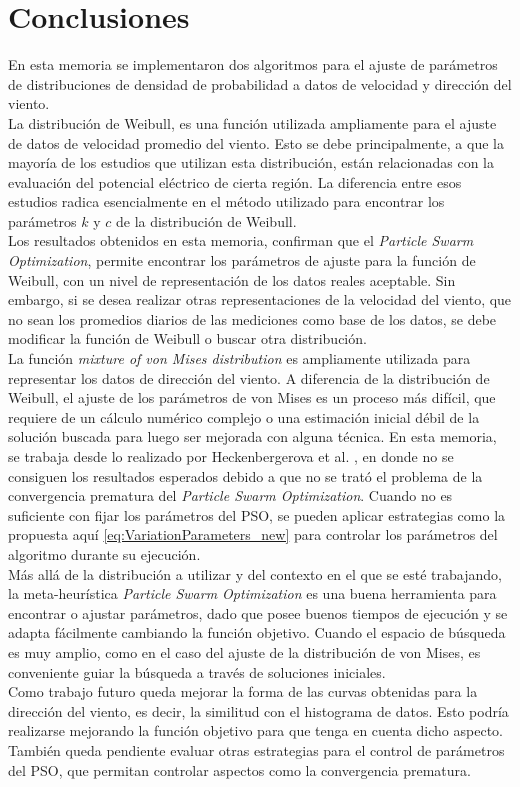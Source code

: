 \chapter{Conclusiones}
En esta memoria se implementaron dos algoritmos para el ajuste de parámetros de distribuciones de densidad de probabilidad a datos de velocidad y dirección del viento.\\
La distribución de Weibull, es una función utilizada ampliamente para el ajuste de datos de velocidad promedio del viento. Esto se debe principalmente, a que la mayoría de los estudios que utilizan esta distribución, están relacionadas con la evaluación del potencial eléctrico de cierta región. La diferencia entre esos estudios radica esencialmente en el método utilizado para encontrar los parámetros $k$ y $c$ de la distribución de Weibull.\\
Los resultados obtenidos en esta memoria, confirman que el \emph{Particle Swarm Optimization}, permite encontrar los parámetros de ajuste para la función de Weibull, con un nivel de representación de los datos reales aceptable. Sin embargo, si se desea realizar otras representaciones de la velocidad del viento, que no sean los promedios diarios de las mediciones como base de los datos, se debe modificar la función de Weibull o buscar otra distribución.\\
La función \emph{mixture of von Mises distribution} es ampliamente utilizada para representar los datos de dirección del viento. A diferencia de la distribución de Weibull, el ajuste de los parámetros de von Mises es un proceso más difícil, que requiere de un cálculo numérico complejo o una estimación inicial débil de la solución buscada para luego ser mejorada con alguna técnica. En esta memoria, se trabaja desde lo realizado por Heckenbergerova et al. \cite{Heckenbergerova15}, en donde no se consiguen los resultados esperados debido a que no se trató el problema de la convergencia prematura del \emph{Particle Swarm Optimization}. Cuando no es suficiente con fijar los parámetros del PSO, se pueden aplicar estrategias como la propuesta aquí \ref{eq:VariationParameters_new} para controlar los parámetros del algoritmo durante su ejecución.\\
Más allá de la distribución a utilizar y del contexto en el que se esté trabajando, la meta-heurística \emph{Particle Swarm Optimization} es una buena herramienta para encontrar o ajustar parámetros, dado que posee buenos tiempos de ejecución y se adapta fácilmente cambiando la función objetivo. Cuando el espacio de búsqueda es muy amplio, como en el caso del ajuste de la distribución de von Mises, es conveniente guiar la búsqueda a través de soluciones iniciales.\\
Como trabajo futuro queda mejorar la forma de las curvas obtenidas para la dirección del viento, es decir, la similitud con el histograma de datos. Esto podría realizarse mejorando la función objetivo para que tenga en cuenta dicho aspecto. También queda pendiente evaluar otras estrategias para el control de parámetros del PSO, que permitan controlar aspectos como la convergencia prematura.\\
